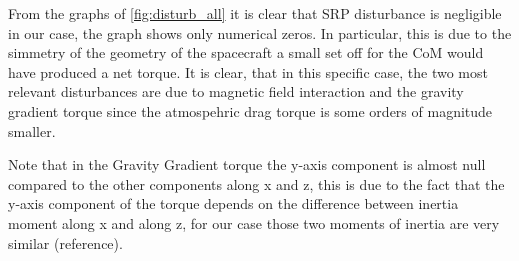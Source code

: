 From the graphs of \autoref{fig:disturb_all} it is clear that SRP disturbance is negligible
in our case, the graph shows only numerical zeros. In particular, this is due to the simmetry of 
the geometry of the spacecraft a small set off for the CoM would have produced a net torque. 
It is clear, that in this specific case, the two most relevant disturbances are due to magnetic field
interaction and the gravity gradient torque since the atmospehric drag torque is some orders of magnitude 
smaller.

Note that in the Gravity Gradient torque the y-axis component is almost null compared to the other 
components along x and z, this is due to the fact that the y-axis component of the torque depends on 
the difference between inertia moment along x and along z, for our case those two moments of inertia are 
very similar (reference). 